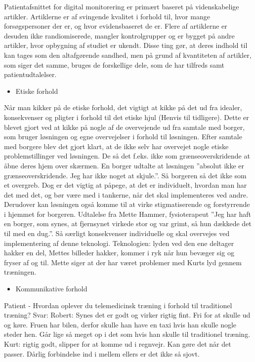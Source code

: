 Patientafsnittet for digital monitorering er primært baseret på videnskabelige artikler. Artiklerne er af svingende kvalitet i forhold til, hvor mange forsøgspersoner der er, og hvor evidensbaseret de er. Flere af artiklerne er desuden ikke randiomiserede, mangler kontrolgrupper og er bygget på andre artikler, hvor opbygning af studiet er ukendt. Disse ting gør, at deres indhold til kan tages som den altafgørende sandhed, men på grund af kvantiteten af artikler, som siger det samme, bruges de forskellige dele, som de har tilfreds samt patientudtalelser.

\begin{itemize}
	\item Etiske forhold
\end{itemize}
Når man kikker på de etiske forhold, det vigtigt at kikke på det ud fra idealer, konsekvenser og pligter i forhold til det etiske hjul (Henvis til tidligere). Dette er blevet gjort ved at kikke på nogle af de overvejende ud fra samtale med borger, som bruger løsningen og egne overvejelser i forhold til løsningen. Efter samtale med borgere blev det gjort klart, at de ikke selv har overvejet nogle etiske problemstillinger ved løsningen. De så det f.eks. ikke som grænseoverskridende at åbne deres hjem over skærmen. En borger udtalte at løsningen ”absolut ikke er grænseoverskridende. Jeg har ikke noget at skjule.”. Så borgeren så det ikke som et overgreb. Dog er det vigtig at påpege, at det er individuelt, hvordan man har det med det, og bør være med i tankerne, når det skal implementeres ved andre. Derudover kan løsningen også komme til at virke stigmatiserende og forstyrrende i hjemmet for borgeren. Udtalelse fra Mette Hammer, fysioterapeut ”Jeg har haft en borger, som synes, at fjernsynet virkede stor og var grimt, så hun dækkede det til med en dug.”. Så særligt konsekvenser individuelle og skal overvejes ved implementering af denne teknologi. Teknologien: lyden ved den ene deltager hakker en del, Mettes billeder hakker, kommer i ryk når hun bevæger sig og fryser af og til. Mette siger at der har været problemer med Kurts lyd gennem træningen.

\begin{itemize}
	\item Kommunikative forhold
\end{itemize}
Patient
-	Hvordan oplever du telemedicinsk træning i forhold til traditionel træning?
Svar:
Robert: Synes det er godt og virker rigtig fint. Fri for at skulle ud og køre. Fruen har bilen, derfor skulle han have en taxi hvis han skulle nogle steder hen. Går lige så meget op i det som hvis han skulle til traditionel træning. Kurt: rigtig godt, slipper for at komme ud i regnvejr. Kan gøre det når det passer. Dårlig forbindelse ind i mellem ellers er det ikke så sjovt.

